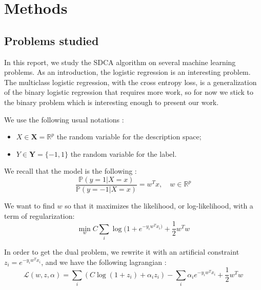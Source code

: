 \documentclass{article}
\begin{document}
\newpage
\section{Methods}

\subsection{Problems studied}

In this report, we study the SDCA algorithm on several machine learning problems.
As an introduction, the logistic regression is an interesting problem.
The multiclass logistic regression, with the cross entropy loss, is a generalization of the binary logistic regression that requires more work, so for now we stick to the binary problem which is interesting enough to present our work.

We use the following usual notations :
\begin{itemize}
	\item[] $X \in \mathbf{X} = \mathbb{R}^p$ the random variable for the description space;
	\item[] $Y \in \mathbf{Y} = \{-1,1\}$ the random variable for the label.
\end{itemize}

We recall that the model is the following :
\begin{equation}
	\frac{\mathbb{P}(y=1 | X=x)}{\mathbb{P}(y=-1 |X=x)} = w^T x, \quad w \in \mathbb{R}^p
\end{equation}

We want to find $w$ so that it maximizes the likelihood, or log-likelihood, with a term of regularization:
\begin{equation}
	\min_w C \sum_i \log(1 + e^{-y_iw^Tx_i)}  + \frac{1}{2} w^Tw
\end{equation}

In order to get the dual problem, we rewrite it with an artificial constraint $z_i = e^{-y_iw^Tx_i}$, and we have the following lagrangian :
\begin{equation}
	\mathcal{L}(w, z, \alpha) = \sum_i (C \log(1+z_i) + \alpha_i z_i) - \sum_i \alpha_i e^{-y_iw^Tx_i} + \frac{1}{2}w^Tw 
\end{equation}
\end{document}
